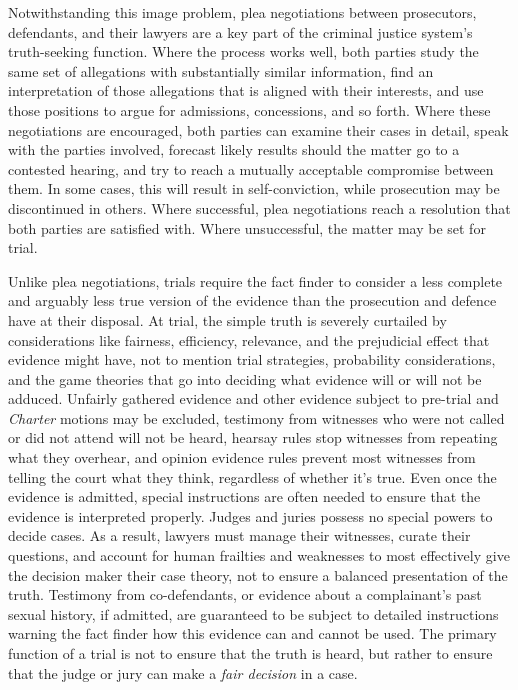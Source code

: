 Notwithstanding this image problem, plea negotiations between prosecutors, defendants, and their lawyers are a key part of the criminal justice system's truth-seeking function. Where the process works well, both parties study the same set of allegations with substantially similar information, find an interpretation of those allegations that is aligned with their interests, and use those positions to argue for admissions, concessions, and so forth. Where these negotiations are encouraged, both parties can examine their cases in detail, speak with the parties involved, forecast likely results should the matter go to a contested hearing, and try to reach a mutually acceptable compromise between them. In some cases, this will result in self-conviction, while prosecution may be discontinued in others. Where successful, plea negotiations reach a resolution that both parties are satisfied with. Where unsuccessful, the matter may be set for trial.

Unlike plea negotiations, trials require the fact finder to consider a less complete and arguably less true version of the evidence than the prosecution and defence have at their disposal. At trial, the simple truth is severely curtailed by considerations like fairness, efficiency, relevance, and the prejudicial effect that evidence might have, not to mention trial strategies, probability considerations, and the game theories that go into deciding what evidence will or will not be adduced. Unfairly gathered evidence and other evidence subject to pre-trial and \textit{Charter} motions may be excluded, testimony from witnesses who were not called or did not attend will not be heard, hearsay rules stop witnesses from repeating what they overhear, and opinion evidence rules prevent most witnesses from telling the court what they think, regardless of whether it's true. Even once the evidence is admitted, special instructions are often needed to ensure that the evidence is interpreted properly. Judges and juries possess no special powers to decide cases. As a result, lawyers must manage their witnesses, curate their questions, and account for human frailties and weaknesses to most effectively give the decision maker their case theory, not to ensure a balanced presentation of the truth. Testimony from co-defendants, or evidence about a complainant's past sexual history, if admitted, are guaranteed to be subject to detailed instructions warning the fact finder how this evidence can and cannot be used. The primary function of a trial is not to ensure that the truth is heard, but rather to ensure that the judge or jury can make a \textit{fair decision} in a case. 

